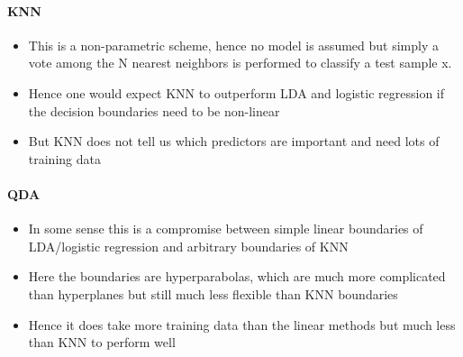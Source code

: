 \documentclass[../document.tex]{subfiles}
\begin{document}
	\paragraph{KNN}
	\begin{itemize}
		\item This is a non-parametric scheme, hence no model is assumed but simply a vote among the N nearest neighbors is performed to classify a test sample x.
		\item Hence one would expect KNN to outperform LDA and logistic regression if the decision boundaries need to be non-linear
		\item But KNN does not tell us which predictors are important and need lots of training data
	\end{itemize}
	\paragraph{QDA}
	\begin{itemize}
		\item In some sense this is a compromise between simple linear boundaries of LDA/logistic regression and arbitrary boundaries of KNN
		\item Here the boundaries are hyperparabolas, which are much more complicated than hyperplanes but still much less flexible than KNN boundaries
		\item Hence it does take more training data than the linear methods but much less than KNN to perform well
	\end{itemize}
	
\end{document}

